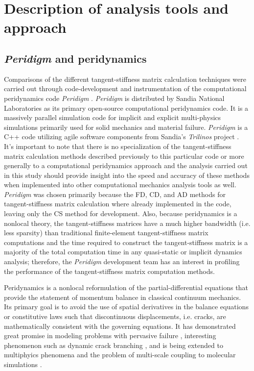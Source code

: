 \documentclass[preprint,12pt]{elsarticle}
\begin{document}
\section{Description of analysis tools and approach} 
%
\subsection{\emph{Peridigm} and peridynamics}
\label{subsec:PaP}
%
Comparisons of the different tangent-stiffness matrix calculation techniques were
carried out through code-development and instrumentation of the
computational peridynamics code \emph{Peridigm} \cite{peridigm}.
\emph{Peridigm} is distributed by Sandia National Laboratories as its primary
open-source computational peridynamics code. It is a massively parallel
simulation code for implicit and explicit multi-physics simulations primarily
used for solid mechanics and material failure. \emph{Peridigm} is a C++ code
utilizing agile software components from Sandia's  \emph{Trilinos} project
\cite{trilinos}. It's important to note that there is no specialization of the
tangent-stiffness matrix calculation methods described previously to this particular
code or more generally to a computational peridynamics approach and the
analysis carried out in this study should provide insight into the speed and
accuracy of these methods when implemented into other computational mechanics
analysis tools as well.  \emph{Peridigm} was chosen primarily because the FD,
CD, and AD methods for tangent-stiffness matrix calculation where already implemented
in the code, leaving only the CS method for development. Also, because
peridynamics is a nonlocal theory, the tangent-stiffness matrices have a much
higher bandwidth (i.e. less sparsity) than traditional finite-element
tangent-stiffness matrix computations and the time required to construct the
tangent-stiffness matrix is a majority of the total computation time in any
quasi-static or implicit dynamics analysis; therefore, the \emph{Peridigm}
development team has an interest in profiling the performance of the
tangent-stiffness matrix computation methods.

Peridynamics \cite{silling2000ret,silling:psa,silling2010peridynamic}
is a nonlocal reformulation of the partial-differential equations that provide
the statement of momentum balance in classical continuum mechanics. Its primary
goal is to avoid the use of spatial derivatives in the balance equations or
constitutive laws such that discontinuous displacements, i.e. cracks, are
mathematically consistent with the governing equations. It has demonstrated
great promise in modeling problems with pervasive failure
\cite{littlewood2010}, interesting phenomenon such as dynamic crack branching
\cite{ha2010sod}, and is being extended to multiphyics phenomena
\cite{bobaru2011peridynamic,katiyar2013} and the problem of multi-scale
coupling to molecular simulations \cite{seleson2009peridynamics,seleson2014atom}. 
\end{document}
